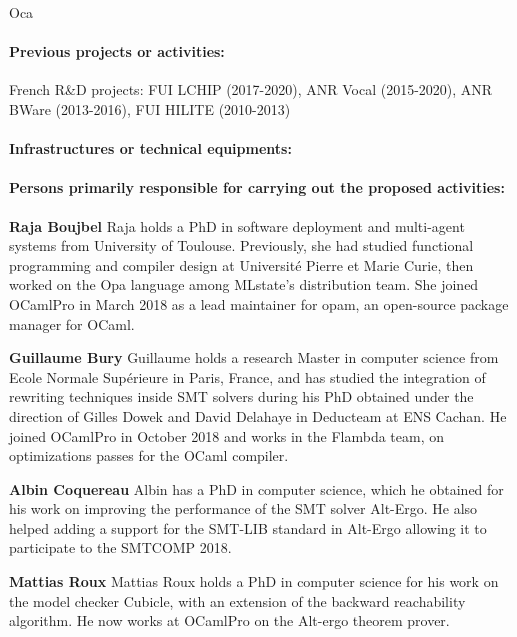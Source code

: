 \begin{sitedescription}{Oca}
\paragraph*{Previous projects or activities:}

\begin{compactitem}
\item French R\&D projects: FUI LCHIP (2017-2020), ANR Vocal (2015-2020), ANR BWare (2013-2016), FUI HILITE (2010-2013)
\end{compactitem}

\paragraph*{Infrastructures or technical equipments:}

\paragraph*{Persons primarily responsible for carrying out the proposed activities:}

\begin{compactitem} %
  \item{\bf Raja Boujbel} Raja holds a PhD in software deployment and
    multi-agent systems from University of Toulouse. Previously, she had studied
    functional programming and compiler design at Université Pierre et Marie
    Curie, then worked on the Opa language among MLstate’s distribution team.
    She joined OCamlPro in March 2018 as a lead maintainer for opam, an
    open-source package manager for OCaml.
\item{\bf Guillaume Bury} Guillaume holds a research Master in computer
    science from Ecole Normale Supérieure in Paris, France, and has studied the
    integration of rewriting techniques inside SMT solvers during his PhD
    obtained under the direction of Gilles Dowek and David Delahaye in
    Deducteam at ENS Cachan. He joined OCamlPro in October 2018 and works in
    the Flambda team, on optimizations passes for the OCaml compiler.
\item{\bf Albin Coquereau} Albin has a PhD in computer science,
    which he obtained for his work on improving the performance of the SMT
    solver Alt-Ergo. He also helped adding a support for the SMT-LIB standard
    in Alt-Ergo allowing it to participate to the SMTCOMP 2018.
\item{\bf Mattias Roux} Mattias Roux holds a PhD in computer science
    for his work on the model checker Cubicle, with an extension of the backward
    reachability algorithm. He now works at OCamlPro on the Alt-ergo theorem
    prover.
\end{compactitem}

\end{sitedescription}

